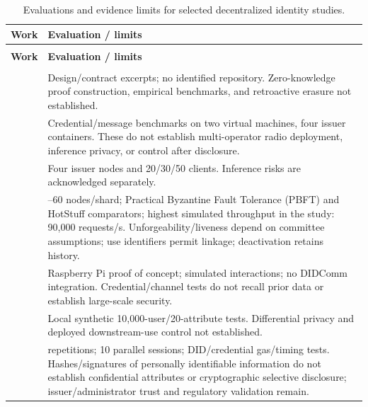\begin{longtable}{@{}>{\raggedright\arraybackslash}m{}>{\raggedright\arraybackslash}m{}@{}}
\caption{Evaluations and evidence limits for selected decentralized identity studies.}\label{tab:ssi-evaluation} \\
\toprule
\textbf{Work} & \textbf{Evaluation / limits} \\
\midrule
\endfirsthead
\multicolumn{2}{l}{\tablename\ \thetable\ (continued)} \\
\toprule
\textbf{Work} & \textbf{Evaluation / limits} \\
\midrule
\endhead
\multicolumn{2}{r}{Continued on the next page} \\
\endfoot
\bottomrule
\endlastfoot
\cite{updateAgarkar2024BADIMAC} & Design/contract excerpts; no identified repository. Zero-knowledge proof construction, empirical benchmarks, and retroactive erasure not established. \\
\addlinespace[5pt]
\cite{updateZeydan2024ABSIdentity} & Credential/message benchmarks on two virtual machines, four issuer containers. These do not establish multi-operator radio deployment, inference privacy, or control after disclosure. \\
\addlinespace[5pt]
\cite{updateZeydan2024SSI} & Four issuer nodes and 20/30/50 clients. Inference risks are acknowledged separately. \\
\addlinespace[5pt]
\cite{updateLiu2024SSDID} & 30--60 nodes/shard; Practical Byzantine Fault Tolerance (PBFT) and HotStuff comparators; highest simulated throughput in the study: 90,000 requests/s. Unforgeability/liveness depend on committee assumptions; use identifiers permit linkage; deactivation retains history. \\
\addlinespace[5pt]
\cite{updateRamirez2025IOTAIdentity} & Raspberry Pi proof of concept; simulated interactions; no DIDComm integration. Credential/channel tests do not recall prior data or establish large-scale security. \\
\addlinespace[5pt]
\cite{updateRen2025AIoTIdentity} & Local synthetic 10,000-user/20-attribute tests. Differential privacy and deployed downstream-use control not established. \\
\addlinespace[5pt]
\cite{updateSeidi2025HealthcareSSI} & 50 repetitions; 10 parallel sessions; DID/credential gas/timing tests. Hashes/signatures of personally identifiable information do not establish confidential attributes or cryptographic selective disclosure; issuer/administrator trust and regulatory validation remain. \\
\end{longtable}

